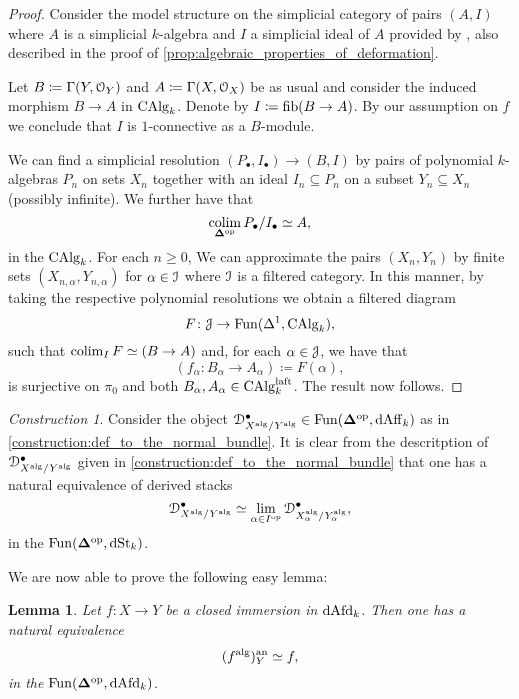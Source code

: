 \documentclass[10pt,a4paper,reqno]{amsart} %
\theoremstyle{plain}
\newtheorem{lem}[thm]{Lemma}
\theoremstyle{definition}
\theoremstyle{remark}
\numberwithin{equation}{section}
\newtheorem{construction}[thm]{Construction}
\begin{document}
\begin{proof}
    Consider the model structure on the simplicial category of pairs $(A, I)$ where $A$ is a simplicial $k$-algebra and $I$ a
    simplicial ideal of $A$ provided by \cite[\S II. 4, Theorem 4]{Quillen_Homotopical_1967}, also described in the proof of \cref{prop:algebraic_properties_of_deformation}.

    Let $B \coloneqq \Gamma(Y, \mathcal O_Y)$ and $A \coloneqq \Gamma(X, \mathcal O_X)$ be as usual and consider the induced morphism $B \to A$ in $\mathrm{CAlg}_k$.
    Denote by $I \coloneqq \mathrm{fib}(B \to A)$. By our assumption on $f$ we conclude that $I$ is $1$-connective as a $B$-module.
    
    We can find a simplicial resolution $(P_\bullet, I_\bullet) \to (B, I)$ by pairs of polynomial $k$-algebras $P_n$ on sets $X_n$ together with an ideal $I_n \subseteq P_n$
    on a subset $Y_n \subseteq X_n$
    (possibly infinite). We further have that
        \[
            \operatorname*{colim}_{\bm{\Delta} ^\mathrm{op}} P_\bullet / I_\bullet \simeq A,  
        \]
    in the \infcat $\mathrm{CAlg}_k$. For each $n \ge 0$, We can approximate the pairs $(X_n, Y_n)$ by finite sets $(X_{n, \alpha}, Y_{n, \alpha})$
    for $\alpha \in \mathcal I$ where $\mathcal I$ is a filtered category. In this manner, by taking the respective polynomial resolutions we obtain a filtered diagram
        \[
            F \colon \mathcal J \to \operatorname{Fun}(\Delta^1, \mathrm{CAlg}_k)  ,
        \]
    such that $\operatorname*{colim}_I F \simeq (B \to A)$ and, for each $\alpha \in \mathcal J$, we have that
        \[
            (f_\alpha \colon B_\alpha \to A_\alpha)  \coloneqq F(\alpha), 
        \]
    is surjective on $\pi_0$ and both $B_\alpha, A_\alpha \in \mathrm{CAlg}_k^{\mathrm{laft}}$. The result now follows.
\end{proof}

\begin{construction}
    Consider the object $\mathcal D_{X^\mathrm{alg}/ Y^\mathrm{alg}}^\bullet \in \operatorname{Fun}(\bm{\Delta} ^\mathrm{op}, \mathrm{dAff}_k)$ as in \cref{construction:def_to_the_normal_bundle}.
    It is clear from the descritption
    of $\mathcal D_{X^\mathrm{alg}/Y^\mathrm{alg}}^\bullet$ given in \cref{construction:def_to_the_normal_bundle} that one has a natural equivalence of derived stacks
        \[
            \mathcal D_{X^\mathrm{alg}/Y^\mathrm{alg}}^\bullet \simeq \lim_{\alpha \in I^\mathrm{op}} \mathcal D_{X_\alpha^\mathrm{alg}/ Y_\alpha^\mathrm{alg}}^\bullet,
        \]
    in the \infcat $\mathrm{Fun}(\bm{\Delta} ^\mathrm{op}, \mathrm{dSt}_k)$.
\end{construction}

We are now able to prove the following easy lemma:

\begin{lem} \label{lem:relative_anlaytification_of_closed_immersions_are_compatible_with_alg_construction}
    Let $f \colon X \to Y$ be a closed immersion in $\mathrm{dAfd}_k$. Then one has a natural equivalence
        \[
            (f ^\mathrm{alg})^\mathrm{an}_Y \simeq f,  
        \]
    in the \infcat $\operatorname{Fun}(\bm{\Delta}^\mathrm{op}, \mathrm{dAfd}_k)$.
\end{lem}
\end{document}
